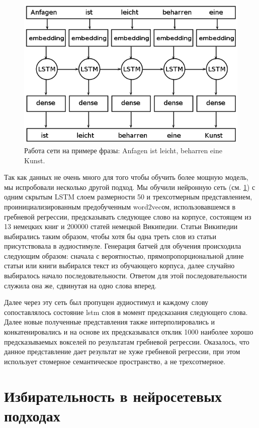 \documentclass[pdftex,ptm,12pt,a4paper]{report}
\theoremstyle{definition}
\begin{document}
\begin{figure}
\centering
\includegraphics[scale=0.5]{images/lstm-architecture.png}
\caption{Работа сети на примере фразы: Anfagen ist leicht, beharren eine Kunst.}
\label{lstm_architecture}
\end{figure}

Так как данных не очень много для того чтобы обучить более мощную модель, мы испробовали несколько другой подход. 
Мы обучили нейронную сеть (см. \ref{lstm_architecture}) с одним скрытым LSTM слоем размерности 50 и трехсотмерным представлением, проинициализированным предобученным word2vecом, использовавшемся в гребневой регрессии, предсказывать следующее слово на корпусе, состоящем из 13 немецких книг и 200000 статей немецкой Википедии. Статьи Википедии выбирались таким образом, чтобы хотя бы одна треть слов из статьи присутствовала в аудиостимуле. Генерация батчей для обучения происходила следующим образом: сначала с вероятностью, прямопропорциональной длине статьи или книги выбирался текст из обучающего корпуса, далее случайно выбиралось начало последовательности. Ответом для этой последовательности служила она же, сдвинутая на одно слова вперед.

Далее через эту сеть был пропущен аудиостимул и каждому слову сопоставлялось состояние lstm слоя в момент предсказания следующего слова. Далее новые полученные представления также интерполировались и конкатенировались и на основе их предсказывался отклик 1000 наиболее хорошо предсказываемых вокселей по результатам гребневой регрессии.
Оказалось, что данное представление дает результат не хуже гребневой регрессии, при этом использует стомерное семантическое  пространство, а не трехсотмерное.

\clearpage
\section{Избирательность в нейросетевых подходах}
\end{document}
